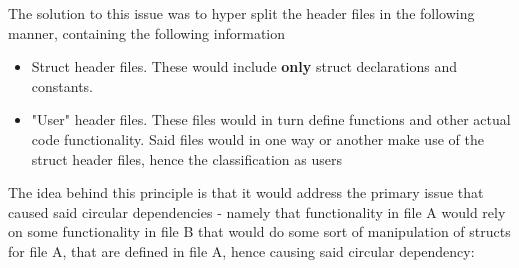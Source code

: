 \documentclass{report}
\begin{document}
\begin{center}
\end{center}
The solution to this issue was to hyper split the header files in the following manner, containing the following information

\begin{itemize}
\item Struct header files. These would include \textbf{only} struct declarations and constants.
\item "User" header files. These files would in turn define functions and other actual code functionality. Said files would in one way or another make use of the struct header files, hence the classification as users
\end{itemize}

The idea behind this principle is that it would address the primary issue that caused said circular dependencies - namely that functionality in file A would rely on some  functionality in file B that would do some sort of manipulation of structs for file A, that are defined in file A, hence causing said circular dependency:
\end{document}
